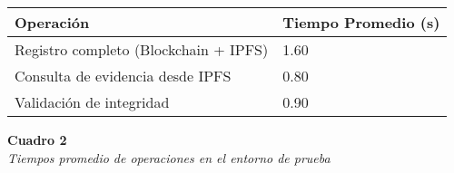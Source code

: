 \begin{center}
\begin{tabular}{|p{4cm}|p{3cm}|}
    \hline
    \textbf{Operación} & \textbf{Tiempo Promedio (s)} \\
    \hline
    Registro completo (Blockchain + IPFS) & 1.60 \\
    \hline
    Consulta de evidencia desde IPFS & 0.80 \\
    \hline
    Validación de integridad & 0.90 \\
    \hline
\end{tabular}

\vspace{1em}
\noindent\textbf{Cuadro 2}\\[2em]
\textit{Tiempos promedio de operaciones en el entorno de prueba}
\end{center} 